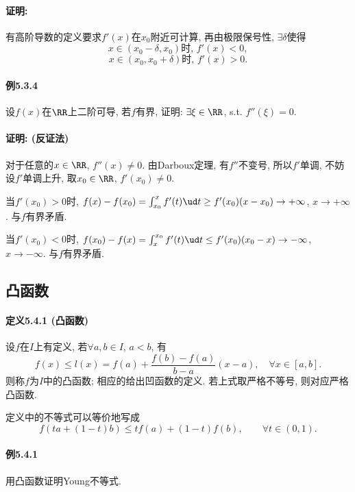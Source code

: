 \paragraph{证明: }

有高阶导数的定义要求$f'(x)$在$x_{0}$附近可计算, 再由极限保号性, $\exists\delta$使得
\[
x\in(x_{0}-\delta,x_{0})\text{时, }f'(x)<0,
\]
\[
x\in(x_{0},x_{0}+\delta)\text{时, }f'(x)>0.
\]


\paragraph{例5.3.4}

设$f(x)$在$\RR$上二阶可导, 若$f$有界, 证明: $\exists\xi\in\RR$, s.t. $f''(\xi)=0$.

\paragraph{证明: (反证法)}

对于任意的$x\in\RR$, $f''(x)\ne0$. 由Darboux定理, 有$f''$不变号, 所以$f'$单调,
不妨设$f'$单调上升, 取$x_{0}\in\RR$, $f'(x_{0})\ne0$.

当$f'(x_{0})>0$时, $f(x)-f(x_{0})=\int_{x_{0}}^{x}f'(t)\ud t\ge f'(x_{0})(x-x_{0})\to+\infty$,
$x\to+\infty$. 与$f$有界矛盾.

当$f'(x_{0})<0$时, $f(x_{0})-f(x)=\int_{x}^{x_{0}}f'(t)\ud t\le f'(x_{0})(x_{0}-x)\to-\infty$,
$x\to-\infty$. 与$f$有界矛盾.

\subsection{凸函数}

\paragraph{定义5.4.1 (凸函数)}

设$f$在$I$上有定义, 若$\forall a,b\in I$, $a<b$, 有
\[
f(x)\le l(x)=f(a)+\frac{f(b)-f(a)}{b-a}(x-a),\quad\forall x\in[a,b].
\]
则称$f$为$I$中的凸函数; 相应的给出凹函数的定义. 若上式取严格不等号, 则对应严格凸函数.

定义中的不等式可以等价地写成
\[
f(ta+(1-t)b)\le tf(a)+(1-t)f(b),\qquad\forall t\in(0,1).
\]


\paragraph{例5.4.1}

用凸函数证明Young不等式.

